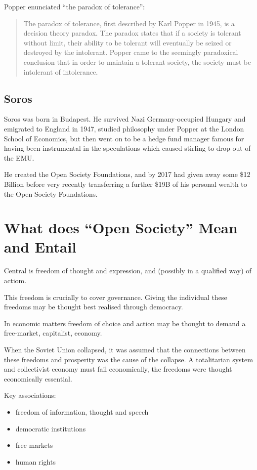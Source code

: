 \documentclass[14pt,titlepage]{extarticle}
\begin{document}
Popper enunciated ``the paradox of tolerance'':

\begin{quote}
The paradox of tolerance, first described by Karl Popper in 1945, is a decision theory paradox.
The paradox states that if a society is tolerant without limit, their ability to be tolerant will eventually be seized or destroyed by the intolerant.
Popper came to the seemingly paradoxical conclusion that in order to maintain a tolerant society, the society must be intolerant of intolerance.
\end{quote}

\subsection{Soros}

Soros was born in Budapest.
He survived Nazi Germany-occupied Hungary and emigrated to England in 1947, studied philosophy under Popper at the London School of Economics, but then went on to be a hedge fund manager famous for having been instrumental in the speculations which caused stirling to drop out of the EMU.

He created the Open Society Foundations, and by 2017 had given away some \$12 Billion before very recently transferring a further \$19B of his personal wealth to the Open Society Foundations.

\section{What does ``Open Society'' Mean and Entail}

Central is freedom of thought and expression, and (possibly in a qualified way) of actiom.

This freedom is crucially to cover governance.
Giving the individual these freedoms may be thought best realised through democracy.

In economic matters freedom of choice and action may be thought to demand a free-market, capitalist, economy.

When the Soviet Union collapsed, it was assumed that the connections between these freedoms and prosperity was the cause of the collapse.
A totalitarian system and collectivist economy must fail economically, the freedoms were thought economically essential.

Key associations:

\begin{itemize}
\item freedom of information, thought and speech
\item democratic institutions
\item free markets
\item human rights
\end{itemize}
\end{document}
